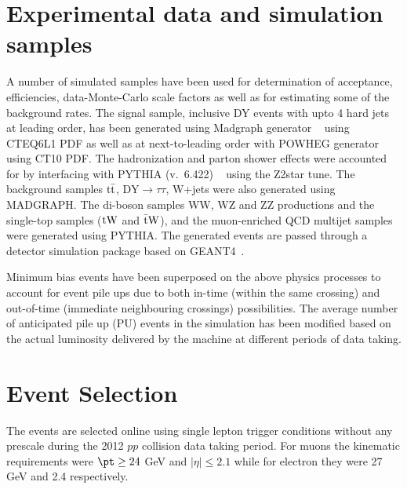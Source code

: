 \section{Experimental data and simulation samples}
\label{sec:datamc_description}



 A number of simulated samples have been  used for determination of acceptance, efficiencies, data-Monte-Carlo scale factors as well as for estimating some of the background rates. The signal sample, inclusive DY events with upto 4 hard jets at leading order, has been generated using {\sc Madgraph} generator ~\cite{MADGRAPH} using CTEQ6L1 PDF as well as at next-to-leading order with {\sc POWHEG} generator ~\cite{Nason:2004rx,Alioli:2008gx,Frixione:2007vw} using CT10 PDF.   The hadronization and parton shower effects were accounted for by interfacing  with {\sc PYTHIA} (v.~6.422) ~\cite{Sjostrand:2006za} using the Z2star tune.  The background samples ${\rm t\bar{t}}$, DY$\to\tau\tau$, W+jets were also generated using MADGRAPH. The di-boson samples WW, WZ  and ZZ productions and the single-top samples (${\rm tW}$ and ${\rm \bar{t}W}$), and the muon-enriched  QCD multijet samples were generated using {\sc PYTHIA}.  The generated events are passed through a detector simulation package based on GEANT4~\cite{Agostinelli:2002hh}.

Minimum bias events have been superposed on the above physics processes to account for event pile ups due to  both in-time (within the same crossing) and out-of-time (immediate neighbouring crossings) possibilities. The average number of anticipated pile up (PU) events in the simulation has been modified based on the actual luminosity delivered by the machine at different periods of data taking.

\section{Event Selection}
\label{sec:EvSelCriteria}

The events are selected online using single lepton trigger conditions without any prescale during the 2012 $pp$ collision data taking period. For muons the kinematic requirements were  $\pt \ge 24$ GeV and $|\eta|\le 2.1$ while for electron they were 27 GeV and 2.4 respectively. 

